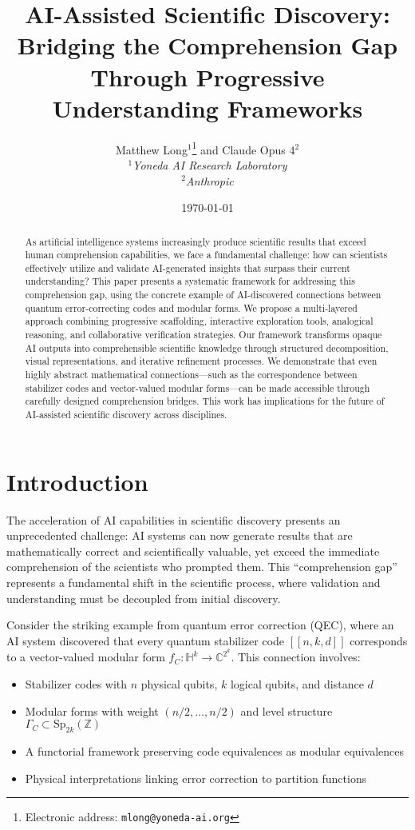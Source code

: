 \documentclass[11pt,a4paper]{article}
\title{AI-Assisted Scientific Discovery: Bridging the Comprehension Gap Through Progressive Understanding Frameworks}
\author{
Matthew Long$^{1}$\thanks{Electronic address: \texttt{mlong@yoneda-ai.org}} \quad and \quad Claude Opus 4$^{2}$\\[2ex]
\textit{$^{1}$Yoneda AI Research Laboratory}\\
\textit{$^{2}$Anthropic}
}
\date{\today}
\newcommand{\C}{\mathbb{C}}
\newcommand{\Z}{\mathbb{Z}}
\newcommand{\HH}{\mathbb{H}}
\newcommand{\Sp}{\mathrm{Sp}}
\begin{document}
\maketitle

\begin{abstract}
As artificial intelligence systems increasingly produce scientific results that exceed human comprehension capabilities, we face a fundamental challenge: how can scientists effectively utilize and validate AI-generated insights that surpass their current understanding? This paper presents a systematic framework for addressing this comprehension gap, using the concrete example of AI-discovered connections between quantum error-correcting codes and modular forms. We propose a multi-layered approach combining progressive scaffolding, interactive exploration tools, analogical reasoning, and collaborative verification strategies. Our framework transforms opaque AI outputs into comprehensible scientific knowledge through structured decomposition, visual representations, and iterative refinement processes. We demonstrate that even highly abstract mathematical connections—such as the correspondence between stabilizer codes and vector-valued modular forms—can be made accessible through carefully designed comprehension bridges. This work has implications for the future of AI-assisted scientific discovery across disciplines.
\end{abstract}

\section{Introduction}

The acceleration of AI capabilities in scientific discovery presents an unprecedented challenge: AI systems can now generate results that are mathematically correct and scientifically valuable, yet exceed the immediate comprehension of the scientists who prompted them. This ``comprehension gap'' represents a fundamental shift in the scientific process, where validation and understanding must be decoupled from initial discovery.

Consider the striking example from quantum error correction (QEC), where an AI system discovered that every quantum stabilizer code $[[n,k,d]]$ corresponds to a vector-valued modular form $f_C: \HH^k \to \C^{2^k}$. This connection involves:
\begin{itemize}
\item Stabilizer codes with $n$ physical qubits, $k$ logical qubits, and distance $d$
\item Modular forms with weight $(n/2, \ldots, n/2)$ and level structure $\Gamma_C \subset \Sp_{2k}(\Z)$
\item A functorial framework preserving code equivalences as modular equivalences
\item Physical interpretations linking error correction to partition functions
\end{itemize}
\end{document}
